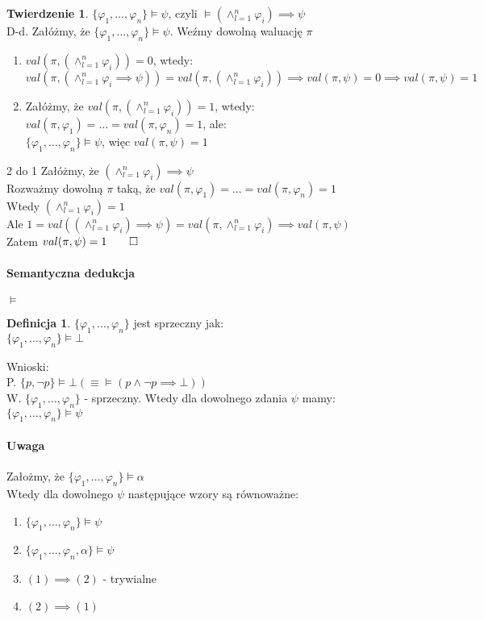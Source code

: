 \documentclass{article}
\theoremstyle{definition}
\newtheorem{de}{Definicja}[subsection]
\theoremstyle{definition}
\newtheorem{tw}{Twierdzenie}[subsection]
\theoremstyle{definition}
\theoremstyle{definition}
\begin{document}
\begin{tw}
$\{\varphi_1,\dots,\varphi_n\}\models \psi$, czyli
$\models (\land_{l=1}^{n} \varphi_i) \implies \psi$\\
D-d. Załóżmy, że $\{\varphi_1,\dots,\varphi_n\}\models \psi$. Weźmy dowolną waluację $\pi$
\begin{enumerate}
    \item $val(\pi, (\land_{l=1}^{n} \varphi_i) )=0$, wtedy:\\
    $val(\pi, (\land_{l=1}^{n} \varphi_i \implies \psi)) = val(\pi, (\land_{l=1}^{n} \varphi_i)) \implies val(\pi, \psi) = 0 \implies val(\pi, \psi) = 1$
    \item Załóżmy, że $val(\pi, (\land_{l=1}^{n} \varphi_i) )=1$, wtedy:\\
    $val(\pi, \varphi_1)=...=val(\pi,\varphi_n)=1$, ale:\\
    $\{\varphi_1,\dots,\varphi_n\}\models \psi$, więc $val(\pi,\psi)=1$
\end{enumerate}
2 do 1
Załóżmy, że $(\land_{l=1}^{n} \varphi_i)\implies \psi$\\
Rozważmy dowolną $\pi$ taką, że $val(\pi,\varphi_1)=...=val(\pi,\varphi_n)=1$\\
Wtedy $(\land_{l=1}^{n} \varphi_i)=1$\\
Ale $1=val((\land_{l=1}^{n} \varphi_i)\implies \psi)=val(\pi, \land_{l=1}^{n} \varphi_i) \implies val(\pi,\psi)$\\
Zatem $val(\pi,\psi)=1\qed$
\end{tw}

\paragraph{Semantyczna dedukcja} $\models$

\begin{de}
    $\{\varphi_1,\dots,\varphi_n\}$ jest sprzeczny jak:\\
    $\{\varphi_1,\dots,\varphi_n\}\models \bot$
\end{de}
Wnioski:\\
P. $\{p, \neg p\}\models \bot (\equiv \models(p\land \neg p\implies \bot))$\\
W. $\{\varphi_1,\dots,\varphi_n\}$ - sprzeczny. Wtedy dla dowolnego zdania $\psi$ mamy:\\
$\{\varphi_1,\dots,\varphi_n\}\models \psi$

\paragraph{Uwaga}
Założmy, że $\{\varphi_1, \dots, \varphi_n\}\models \alpha$\\
Wtedy dla dowolnego $\psi$ następujące wzory są równoważne:
\begin{enumerate}
    \item $\{\varphi_1,\dots,\varphi_n\}\models \psi$
    \item $\{\varphi_1,\dots,\varphi_n,\alpha\}\models \psi$
    \item $(1)\implies(2)$ - trywialne
    \item $(2)\implies(1)$ 
\end{enumerate}
\end{document}
